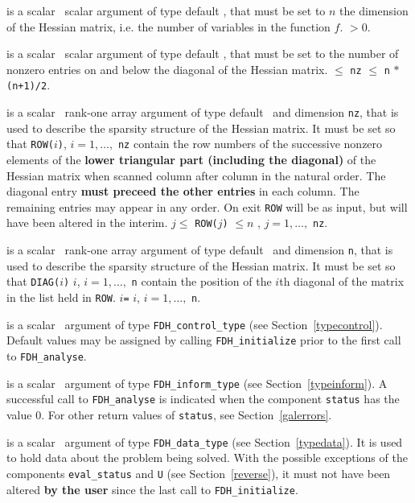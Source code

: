 \documentclass{galahad}
\newcommand{\packagename}{FDH}
\begin{document}
\vspace*{-2mm}
\begin{description}
is a scalar \intentin\ scalar argument of type default \integer, that must be 
set to $n$ the dimension of the Hessian matrix, i.e. the number of
variables in the function $f$. 
 $> 0$.

is a scalar \intentin\ scalar argument of type default \integer, that must be
set to the number of nonzero entries on and below the diagonal of the Hessian
matrix.
 $\le$ {\tt nz} $\le$ {\tt n} $\ast$ {\tt (n+1)/2}.

 is a scalar \intentinout\ rank-one array argument of type 
default \integer\ and dimension {\tt nz}, that is used to describe 
the sparsity structure of the Hessian matrix. It must be set so that
 {\tt ROW(}$i${\tt)}, $i = 1, \ldots,$ {\tt nz} contain the row 
numbers of the successive nonzero elements of the {\bf lower triangular part
(including the diagonal)} of the Hessian matrix when scanned column after
column in the natural order. The diagonal entry 
{\bf must preceed the other entries} in each column. The remaining entries 
may appear in any order. On exit {\tt ROW} will be as input, but will have
been altered in the interim.
\restrictions 
$j \leq$ {\tt ROW(}$j${\tt)} $\leq n$ , $j = 1, \ldots,$ {\tt nz}.

is a scalar \intentin\ rank-one array argument of type 
default \integer\ and dimension {\tt n}, that is used to describe 
the sparsity structure of the Hessian matrix. It must be set so that
 {\tt DIAG(}$i${\tt)} $i$, $i = 1, \ldots,$ {\tt n}
contain the position of the $i$th diagonal of the matrix in the list held
in {\tt ROW}.
$i${\tt=} $i$, $i = 1, \ldots,$ {\tt n}.

 is a scalar \intentin\ argument of type 
{\tt \packagename\_control\_type}
(see Section~\ref{typecontrol}). Default values may be assigned by calling 
{\tt \packagename\_initialize} prior to the first call to 
{\tt \packagename\_analyse}. 

 is a scalar \intentinout\ argument of type 
{\tt \packagename\_inform\_type}
(see Section~\ref{typeinform}). 
A successful call to
{\tt \packagename\_analyse}
is indicated when the  component {\tt status} has the value 0. 
For other return values of {\tt status}, see Section~\ref{galerrors}.

 is a scalar \intentinout\ argument of type 
{\tt \packagename\_data\_type}
(see Section~\ref{typedata}). It is used to hold data about the problem being 
solved. With the possible exceptions of the components 
{\tt eval\_status} and {\tt U} (see Section~\ref{reverse}), 
it must not have been altered {\bf by the user} since the last call to 
{\tt \packagename\_initialize}.

\end{description}
\end{document}
